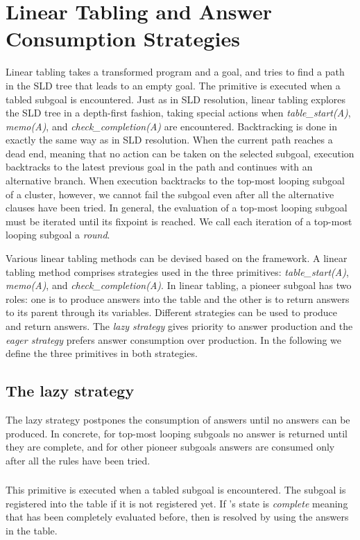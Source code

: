 \documentclass{tlp}
\begin{document}
\section{Linear Tabling and Answer Consumption Strategies}
Linear tabling takes a transformed program and a goal, and tries to find a path in the SLD tree that leads to an empty goal. The primitive  is executed when a tabled subgoal  is encountered. Just as in SLD resolution, linear tabling explores the SLD tree in a depth-first fashion, taking special actions when {\it table\_start(A)}, {\it memo(A)}, and {\it check\_completion(A)} are encountered.  Backtracking is done in exactly the same way as in SLD resolution. When the current path reaches a dead end, meaning that no action can be taken on the selected subgoal, execution backtracks to the latest previous goal in the path and continues with an alternative branch. When execution backtracks to the top-most looping subgoal of a cluster, however, we cannot fail the subgoal even after all the alternative clauses have been tried. In general, the evaluation of a top-most looping subgoal must be iterated until its fixpoint is reached. We call each iteration of a top-most looping subgoal a {\it round}.

Various linear tabling methods can be devised based on the framework. A linear tabling method comprises strategies used in the three primitives: {\it table\_start(A)}, {\it memo(A)}, and {\it check\_completion(A)}. In linear tabling, a pioneer subgoal has two roles: one is to produce answers into the table and the other is to return answers to its parent through its variables. Different strategies can be used to produce and return answers. The {\it lazy strategy} gives priority to answer production and the {\it eager strategy} prefers answer consumption over production. In the following we define the three primitives in both strategies.

\subsection{\label{subsection:lazy}The lazy strategy}
The lazy strategy postpones the consumption of answers until no answers can be produced. In concrete, for top-most looping subgoals no answer is returned until they are complete, and for other pioneer subgoals answers are consumed only after all the rules have been tried.


\subsubsection{}
This primitive is executed when a tabled subgoal  is encountered. The subgoal  is registered into the table if it is not registered yet. If 's state is {\it complete} meaning that  has been completely evaluated before, then  is resolved by using the answers in the table. 
\end{document}
